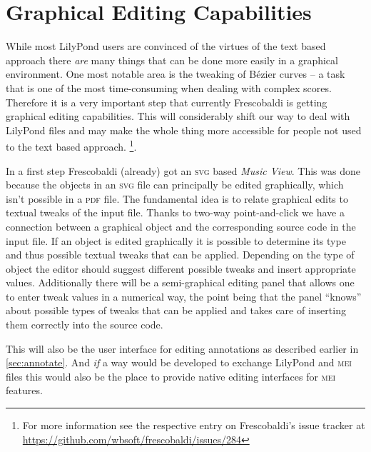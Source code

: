 \documentclass[oneside]{OLLbook}
\begin{document}
\section{Graphical Editing Capabilities}

While most LilyPond users are convinced of the virtues of the text based approach there \emph{are} many things that can be done more easily in a graphical environment.
One most notable area is the tweaking of Bézier curves -- a task that is one of the most time-consuming when dealing with complex scores.
Therefore it is a very important step that currently Frescobaldi is getting graphical editing capabilities.
This will considerably shift our way to deal with LilyPond files and may make the whole thing more accessible for people not used to the text based approach.%
\footnote{For more information see the respective entry on Frescobaldi's issue tracker at \url{https://github.com/wbsoft/frescobaldi/issues/284}}.

In a first step Frescobaldi (already) got an \textsc{svg} based \emph{Music View}.
This was done because the objects in an \textsc{svg} file can principally be edited graphically, which isn't possible in a \textsc{pdf} file.
The fundamental idea is to relate graphical edits to textual tweaks of the input file.
Thanks to two-way point-and-click we have a connection between a graphical object and the corresponding source code in the input file.
If an object is edited graphically it is possible to determine its type and thus possible textual tweaks that can be applied.
Depending on the type of object the editor should suggest different possible tweaks and insert appropriate values. 
Additionally there will be a semi-graphical editing panel that allows one to enter tweak values in a numerical way, the point being that the panel “knows” about possible types of tweaks that can be applied and takes care of inserting them correctly into the source code.

This will also be the user interface for editing annotations as described earlier in \ref{sec:annotate}.
And \emph{if} a way would be developed to exchange LilyPond and \textsc{mei} files this would also be the place to provide native editing interfaces for \textsc{mei} features.
\end{document}
